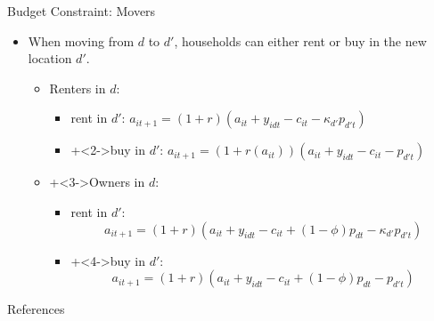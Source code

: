 \documentclass[12pt,english, aspectratio=169]{beamer}
\begin{document}
\begin{frame}{Budget Constraint: Movers}

\begin{itemize}
\item When moving from $d$ to $d'$, households can either rent or buy
in the new location $d'$.
\begin{itemize}
\item Renters in $d$:

\begin{itemize}
\item rent in $d'$: $a_{it+1}=(1+r)\left(a_{it}+y_{idt}-c_{it}-\kappa_{d'}p_{d't}\right)$
\item \onslide+<2->buy in $d'$: $a_{it+1}=(1+r(a_{it}))\left(a_{it}+y_{idt}-c_{it}-p_{d't}\right)$
\end{itemize}
\item \onslide+<3->Owners in $d$:

\begin{itemize}
\item rent in $d'$: 
\[
a_{it+1}=(1+r)\left(a_{it}+y_{idt}-c_{it}+(1-\phi)p_{dt}-\kappa_{d'}p_{d't}\right)
\]
\item \onslide+<4->buy in $d'$: 
\[
a_{it+1}=(1+r)\left(a_{it}+y_{idt}-c_{it}+(1-\phi)p_{dt}-p_{d't}\right)
\]
\end{itemize}
\end{itemize}
\end{itemize}
\end{frame}



\begin{frame}[allowframebreaks]{References}
		
		
\end{frame}
\end{document}
